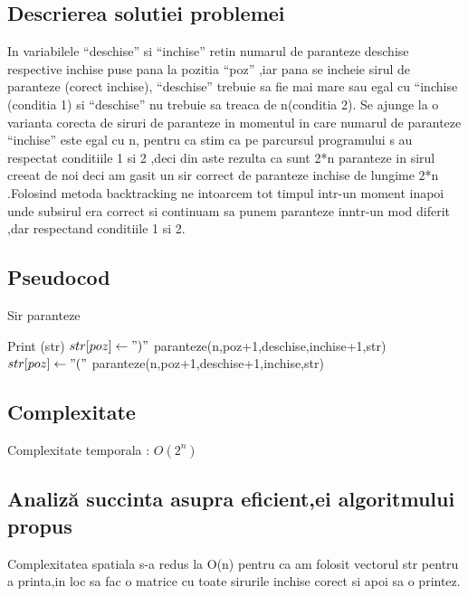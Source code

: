 \documentclass[runningheads]{llncs}
\begin{document}
\subsection{Descrierea solutiei problemei}
In variabilele “deschise” si “inchise” retin numarul de paranteze deschise respective inchise puse pana la pozitia “poz” ,iar pana se incheie sirul de paranteze (corect inchise), “deschise” trebuie sa fie mai mare sau egal cu “inchise (conditia 1) si “deschise” nu trebuie sa treaca de n(conditia 2).
Se ajunge la o varianta corecta de siruri de paranteze in momentul in care numarul de paranteze “inchise” este egal cu n, pentru ca stim ca pe parcursul programului s au respectat conditiile 1 si 2 ,deci din aste rezulta ca sunt 2*n paranteze in sirul creeat de noi deci am gasit un sir correct de paranteze inchise de lungime 2*n .Folosind metoda backtracking ne intoarcem tot timpul intr-un moment inapoi unde subsirul era correct si continuam sa punem paranteze inntr-un mod diferit ,dar respectand conditiile 1 si 2.
\subsection{Pseudocod}
\begin{algorithm}
\caption{Sir paranteze}\label{euclid}
\begin{algorithmic}[1]
 \State Print (str)
\Else 
{}
\State $str[poz]\gets ")"$
\State paranteze(n,poz+1,deschise,inchise+1,str)
\EndIf
{}
\State $str[poz]\gets "("$
\State paranteze(n,poz+1,deschise+1,inchise,str)
\EndIf
\EndIf
\EndProcedure
\end{algorithmic}
\end{algorithm}
\subsection{Complexitate}
Complexitate temporala : $O (2^n)$
\subsection{Analiză succinta asupra eficient,ei algoritmului propus}
Complexitatea spatiala s-a redus la O(n) pentru ca am folosit vectorul str pentru a printa,in loc sa fac o matrice cu toate sirurile inchise corect si apoi sa o printez.
\end{document}
